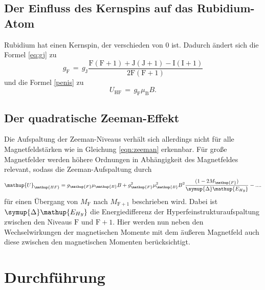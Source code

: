 \documentclass[
  bibliography=totoc,     %
  captions=tableheading,  %
  titlepage=firstiscover, %
]{scrartcl}
\begin{document}
\subsection{Der Einfluss des Kernspins auf das Rubidium-Atom}
Rubidium hat einen Kernspin, der verschieden von 0 ist. Dadurch ändert sich die
Formel \eqref{eq:gj} zu
\begin{equation}
  g_{\mathup{F}}\,=\,g_{\mathup{J}} \frac{\mathup{F}(\mathup{F}+1)+\mathup{J}(\mathup{J}+1)-\mathup{I}(\mathup{I}+1)}{2\mathup{F}(\mathup{F}+1)}
  \label{eqn:gflande}
\end{equation}
und die Formel \eqref{penis} zu
\begin{equation}
  U_{\mathup{HF}}\,=\,g_{\mathup{F}}\mu_{\mathup{B}}B.
  \label{eqn:zeeman}
\end{equation}
\subsection{Der quadratische Zeeman-Effekt}

Die Aufspaltung der Zeeman-Niveaus verhält sich allerdings nicht für alle Magnetfeldstärken
wie in Gleichung \eqref{eqn:zeeman} erkennbar. Für große Magnetfelder werden höhere
Ordnungen in Abhängigkeit des Magnetfeldes relevant, sodass die Zeeman-Aufspaltung durch
%
\begin{equation}
  \mathup{U}_{\mathup{HF}} = g_{\mathup{F}}\mu_{\mathup{B}}B + g_{\mathup{F}}^2\mu_{\mathup{B}}^2B^2\frac{(1-2M_{\mathup{F}})}{\symup{\Delta} \mathup{E_{Hy}}} - ....
  \label{eq:quad_zeeman}
\end{equation}
%
für einen Übergang von $M_\mathup{F}$ nach $M_{\mathup{F}+1}$ beschrieben wird. Dabei ist $\symup{\Delta} \mathup{E_{Hy}}$ die Energiedifferenz der
Hyperfeinstrukturaufspaltung zwischen den Niveaus $\mathup{F}$ und $\mathup{F}+1$.
Hier werden nun neben den Wechselwirkungen der magnetischen Momente mit dem äußeren
Magnetfeld auch diese zwischen den magnetischen Momenten berücksichtigt.

\section{Durchführung}
\label{sec:durchführung}
\end{document}
